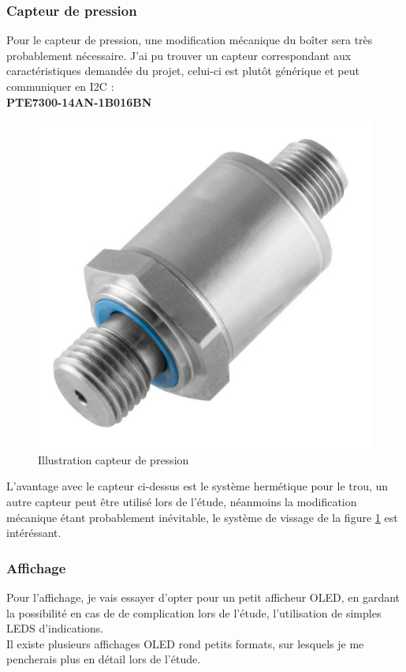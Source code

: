 {\clearpage

\subsubsection{Capteur de pression}
{
Pour le capteur de pression, une modification mécanique du boîter sera très probablement nécessaire. J'ai pu trouver un capteur correspondant aux caractéristiques demandée du projet, celui-ci est plutôt générique et peut communiquer en I2C : \\
\textbf{PTE7300-14AN-1B016BN}

\begin{figure}[h] 
    \centering
    \includegraphics[width=.4\textwidth]{Figures/Capteur-pression}
    \caption{Illustration capteur de pression}
    \label{fig:CaptPress}
\end{figure}

L'avantage avec le capteur ci-dessus est le système hermétique pour le trou, un autre capteur peut être utilisé lors de l'étude, néanmoins la modification mécanique étant probablement inévitable, le système de vissage de la figure \ref{fig:CaptPress} est intéréssant.

}

\subsubsection{Affichage}
{
    Pour l'affichage, je vais essayer d'opter pour un petit afficheur OLED, en gardant la possibilité en cas de de complication lors de l'étude, l'utilisation de simples LEDS d'indications.
    \\
    Il existe plusieurs affichages OLED rond petits formats, sur lesquels je me pencherais plus en détail lors de l'étude.
    


}

\newpage
}
